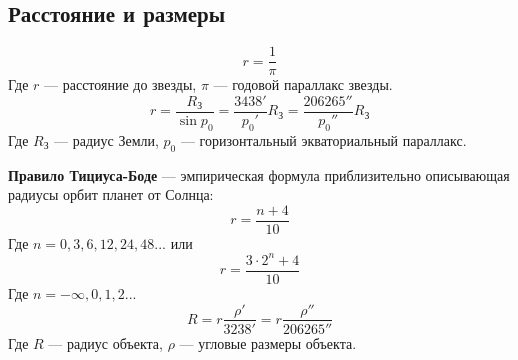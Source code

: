 \subsection{Расстояние и размеры}
$$r=\frac{1}{\pi}$$
Где $r$ --- расстояние до звезды, $\pi$ --- годовой параллакс звезды.
$$r=\frac{R_{\text{З}}}{\sin p_0}=\frac{3438'}{p_0'}R_{\text{З}}=\frac{206265''}{p_0''}R_{\text{З}}$$
Где $R_{\text{З}}$ --- радиус Земли, $p_0$ --- горизонтальный экваториальный параллакс.

\textbf{Правило Тициуса-Боде} --- эмпирическая формула приблизительно описывающая радиусы орбит планет от Солнца:
$$r=\frac{n+4}{10}$$
Где $n=0, 3 ,6, 12, 24, 48...$ или
$$r=\frac{3\cdot 2^n+4}{10}$$
Где $n=-\infty, 0, 1, 2...$
$$R=r\frac{\rho'}{3238'}=r\frac{\rho''}{206265''}$$
Где $R$ --- радиус объекта, $\rho$ --- угловые размеры объекта.
